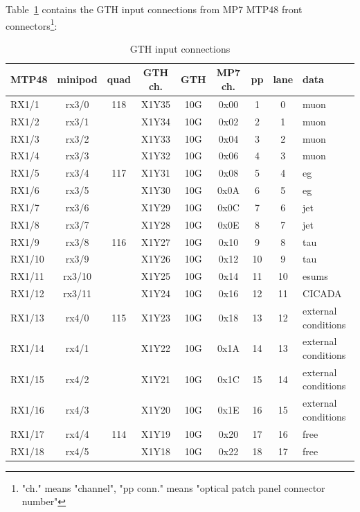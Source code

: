 Table~\ref{tab:app:gth_i_conn} contains the GTH input connections from MP7 MTP48 front connectors\footnote{"ch." means "channel", "pp conn." means "optical patch panel connector number"}:

\begin{longtable}{|l|c|c|c|c|c|c|c|l|}
\caption{GTH input connections}
    \label{tab:app:gth_i_conn}\\
\hline
\textbf{MTP48}& \textbf{minipod}& \textbf{quad}& \textbf{GTH ch.}& \textbf{GTH}& \textbf{MP7 ch.} &\textbf{pp}& \textbf{lane}& \textbf{data}\\
\hline
\hline
\endhead
RX1/1  & rx3/0  & 118 & X1Y35 & 10G & 0x00 & 1  & 0  & muon\\\hline
RX1/2  & rx3/1  &     & X1Y34 & 10G & 0x02 & 2  & 1  & muon\\\hline
RX1/3  & rx3/2  &     & X1Y33 & 10G & 0x04 & 3  & 2  & muon\\\hline
RX1/4  & rx3/3  &     & X1Y32 & 10G & 0x06 & 4  & 3  & muon\\\hline
RX1/5  & rx3/4  & 117 & X1Y31 & 10G & 0x08 & 5  & 4  & eg\\\hline
RX1/6  & rx3/5  &     & X1Y30 & 10G & 0x0A & 6  & 5  & eg\\\hline
RX1/7  & rx3/6  &     & X1Y29 & 10G & 0x0C & 7  & 6  & jet\\\hline
RX1/8  & rx3/7  &     & X1Y28 & 10G & 0x0E & 8  & 7  & jet\\\hline
RX1/9  & rx3/8  & 116 & X1Y27 & 10G & 0x10 & 9  & 8  & tau\\\hline
RX1/10 & rx3/9  &     & X1Y26 & 10G & 0x12 & 10 & 9  & tau\\\hline
RX1/11 & rx3/10 &     & X1Y25 & 10G & 0x14 & 11 & 10 & esums\\\hline
RX1/12 & rx3/11 &     & X1Y24 & 10G & 0x16 & 12 & 11 & CICADA\\\hline
RX1/13 & rx4/0  & 115 & X1Y23 & 10G & 0x18 & 13 & 12 & external conditions\\\hline
RX1/14 & rx4/1  &     & X1Y22 & 10G & 0x1A & 14 & 13 & external conditions\\\hline
RX1/15 & rx4/2  &     & X1Y21 & 10G & 0x1C & 15 & 14 & external conditions\\\hline
RX1/16 & rx4/3  &     & X1Y20 & 10G & 0x1E & 16 & 15 & external conditions\\\hline
RX1/17 & rx4/4  & 114 & X1Y19 & 10G & 0x20 & 17 & 16 & free\\\hline
RX1/18 & rx4/5  &     & X1Y18 & 10G & 0x22 & 18 & 17 & free\\\hline

\end{longtable}
